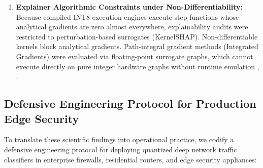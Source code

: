 \documentclass[conference]{IEEEtran}
\begin{document}
\begin{enumerate}
    \item \textbf{Explainer Algorithmic Constraints under Non-Differentiability:} Because compiled INT8 execution engines execute step functions whose analytical gradients are zero almost everywhere, explainability audits were restricted to perturbation-based surrogates (KernelSHAP). Non-differentiable kernels block analytical gradients. Path-integral gradient methods (Integrated Gradients) were evaluated via floating-point surrogate graphs, which cannot execute directly on pure integer hardware graphs without runtime emulation \cite{b29}, \cite{b33}.
\end{enumerate}

\subsection{Defensive Engineering Protocol for Production Edge Security}
To translate these scientific findings into operational practice, we codify a defensive engineering protocol for deploying quantized deep network traffic classifiers in enterprise firewalls, residential routers, and edge security appliances:
\end{document}

